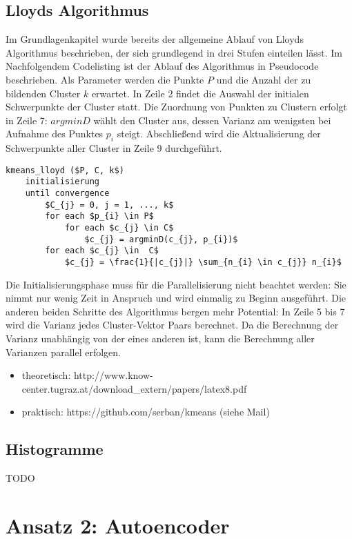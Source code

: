 \subsection{Lloyds Algorithmus}

Im Grundlagenkapitel wurde bereits der allgemeine Ablauf von Lloyds Algorithmus beschrieben, der sich grundlegend in drei Stufen einteilen lässt. Im Nachfolgendem Codelisting ist der Ablauf des Algorithmus in Pseudocode beschrieben. Als Parameter werden die Punkte $P$ und die Anzahl der zu bildenden Cluster $k$ erwartet. In Zeile 2 findet die Auswahl der initialen Schwerpunkte der Cluster statt. Die Zuordnung von Punkten zu Clustern erfolgt in Zeile 7: $argminD$ wählt den Cluster aus, dessen Varianz am wenigsten bei Aufnahme des Punktes $p_{i}$ steigt. Abschließend wird die Aktualisierung der Schwerpunkte aller Cluster in Zeile 9 durchgeführt.

\lstset{language=C}
\begin{lstlisting}[mathescape=true]
kmeans_lloyd ($P, C, k$)
	initialisierung
	until convergence
		$C_{j} = 0, j = 1, ..., k$
		for each $p_{i} \in P$
			for each $c_{j} \in C$
				$c_{j} = argminD(c_{j}, p_{i})$		
		for each $c_{j} \in  C$
			$c_{j} = \frac{1}{|c_{j}|} \sum_{n_{i} \in c_{j}} n_{i}$
\end{lstlisting}

Die Initialisierungsphase muss für die Parallelisierung nicht beachtet werden: Sie nimmt nur wenig Zeit in Anspruch und wird einmalig zu Beginn ausgeführt. Die anderen beiden Schritte des Algorithmus bergen mehr Potential: In Zeile 5 bis 7 wird die Varianz jedes Cluster-Vektor Paars berechnet. Da die Berechnung der Varianz unabhängig von der eines anderen ist, kann die Berechnung aller Varianzen parallel erfolgen. 

\begin{itemize}
	\item theoretisch: http://www.know-center.tugraz.at/download\_extern/papers/latex8.pdf
	\item praktisch: https://github.com/serban/kmeans (siehe Mail)
\end{itemize}

\subsection{Histogramme}

TODO

\section{Ansatz 2: Autoencoder}

